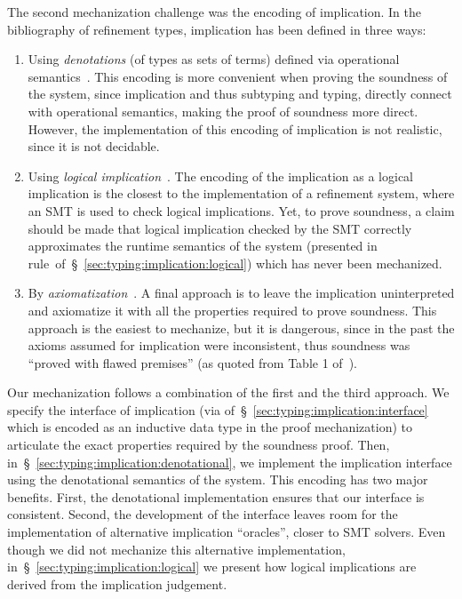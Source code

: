 %
The second mechanization challenge was the encoding of implication.
In the bibliography of refinement types, implication has been defined in three ways:
\begin{enumerate}[leftmargin=*]
\item Using \emph{denotations} (of types as sets of terms) defined via operational semantics~\cite{Vazou18, flanagan06}.
This encoding is more convenient when proving the soundness of the system, since implication
and thus subtyping and typing, directly connect with operational semantics, making the proof of soundness more direct.
However, the implementation of this encoding of implication is not realistic, since it is not decidable.
\item Using \emph{logical implication}~\cite{LiquidPLDI08, Gordon2010PrinciplesAA}.
The encoding of the implication as a logical implication is the closest to the implementation of a refinement system,
where an SMT is used to check logical implications. Yet, to prove soundness, a claim should be made that
logical implication checked by the SMT correctly approximates the runtime semantics of the system
(\ie presented in rule~\iLog of~\S~\ref{sec:typing:implication:logical}) which has never been mechanized.
\item By \emph{axiomatization}~\cite{LehmannTanter}.
A final approach is to leave the implication uninterpreted and axiomatize it with all the properties required to prove soundness.
This approach is the easiest to mechanize, but it is dangerous, since in the past the axioms assumed for implication
were inconsistent, thus soundness was ``proved with flawed premises'' (as quoted from Table 1 of~\cite{SekiyamaIG17}).
\end{enumerate}
Our mechanization follows a combination of the first and the third approach.
We specify the interface of implication (via  of~\S~\ref{sec:typing:implication:interface} which is encoded as
an inductive data type in the proof mechanization)
to articulate the exact properties required by the soundness proof.
Then, in~\S~\ref{sec:typing:implication:denotational}, we implement the implication interface using
the denotational semantics of the system.
This encoding has two major benefits.
First, the denotational implementation ensures that our interface is consistent.
Second, the development of the interface leaves room for the implementation
of alternative implication ``oracles'', \eg closer to SMT solvers.
Even though we did not mechanize this alternative implementation, in~\S~\ref{sec:typing:implication:logical} we present how
logical implications are derived from the implication judgement.


